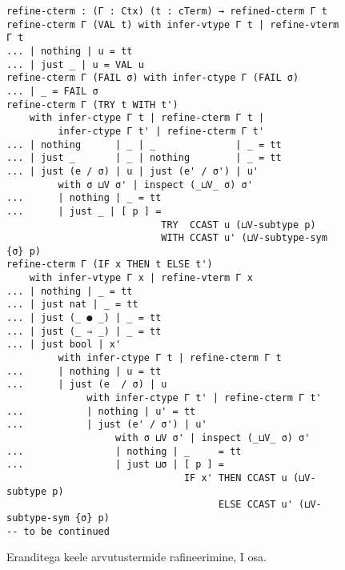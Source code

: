 \documentclass[a4paper,12pt]{article}
\begin{document}
\begin{figure}
  \begin{BVerbatim}
refine-cterm : (Γ : Ctx) (t : cTerm) → refined-cterm Γ t
refine-cterm Γ (VAL t) with infer-vtype Γ t | refine-vterm Γ t
... | nothing | u = tt
... | just _ | u = VAL u
refine-cterm Γ (FAIL σ) with infer-ctype Γ (FAIL σ)
... | _ = FAIL σ
refine-cterm Γ (TRY t WITH t')
    with infer-ctype Γ t | refine-cterm Γ t |
         infer-ctype Γ t' | refine-cterm Γ t'
... | nothing      | _ | _              | _ = tt
... | just _       | _ | nothing        | _ = tt
... | just (e / σ) | u | just (e' / σ') | u'
         with σ ⊔V σ' | inspect (_⊔V_ σ) σ'
...      | nothing | _ = tt
...      | just _ | [ p ] =
                           TRY  CCAST u (⊔V-subtype p)
                           WITH CCAST u' (⊔V-subtype-sym {σ} p)
refine-cterm Γ (IF x THEN t ELSE t')
    with infer-vtype Γ x | refine-vterm Γ x
... | nothing | _ = tt
... | just nat | _ = tt
... | just (_ ● _) | _ = tt
... | just (_ ⇒ _) | _ = tt
... | just bool | x'
         with infer-ctype Γ t | refine-cterm Γ t
...      | nothing | u = tt
...      | just (e  / σ) | u
              with infer-ctype Γ t' | refine-cterm Γ t'
...           | nothing | u' = tt
...           | just (e' / σ') | u'
                   with σ ⊔V σ' | inspect (_⊔V_ σ) σ'
...                | nothing | _     = tt
...                | just ⊔σ | [ p ] =
                               IF x' THEN CCAST u (⊔V-subtype p)
                                     ELSE CCAST u' (⊔V-subtype-sym {σ} p)
-- to be continued
  \end{BVerbatim}
  \caption{Eranditega keele arvutustermide rafineerimine, I osa.}
  \label{fig:exc.refine-cterm1}
\end{figure}
\end{document}
